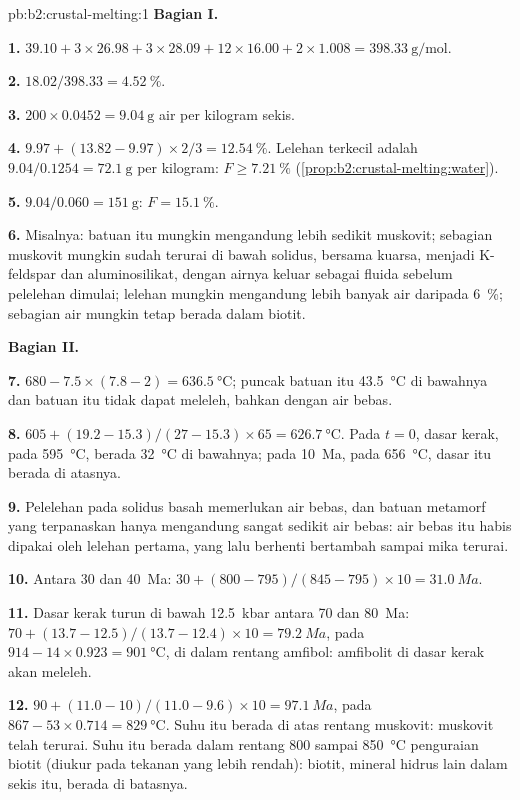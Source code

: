 \begin{solution}{pb:b2:crustal-melting:1}
\noindent\textbf{Bagian I.}

\textbf{1.} $39.10 + 3\times26.98 + 3\times28.09 + 12\times16.00 + 2\times1.008 =
\qty{398.33}{\gram\per\mole}$.

\textbf{2.} $18.02/398.33 = \qty{4.52}{\percent}$.

\textbf{3.} $200\times0.0452 = \qty{9.04}{\gram}$ air per kilogram sekis.

\textbf{4.} $9.97 + (13.82 - 9.97)\times2/3 = \qty{12.54}{\percent}$. Lelehan terkecil adalah
$9.04/0.1254 = \qty{72.1}{\gram}$ per kilogram: $F \ge \qty{7.21}{\percent}$
(\cref{prop:b2:crustal-melting:water}).

\textbf{5.} $9.04/0.060 = \qty{151}{\gram}$: $F = \qty{15.1}{\percent}$.

\textbf{6.} Misalnya: batuan itu mungkin mengandung lebih sedikit muskovit; sebagian muskovit mungkin
sudah terurai di bawah solidus, bersama kuarsa, menjadi K-feldspar dan
aluminosilikat, dengan airnya keluar sebagai fluida sebelum pelelehan dimulai; lelehan mungkin mengandung lebih banyak
air daripada \qty{6}{\percent}; sebagian air mungkin tetap berada dalam biotit.

\noindent\textbf{Bagian II.}

\textbf{7.} $680 - 7.5\times(7.8 - 2) = \qty{636.5}{\celsius}$; puncak batuan itu
\qty{43.5}{\celsius} di bawahnya dan batuan itu tidak dapat meleleh, bahkan dengan air bebas.

\textbf{8.} $605 + (19.2 - 15.3)/(27 - 15.3)\times65 = \qty{626.7}{\celsius}$. Pada
$t = 0$, dasar kerak, pada \qty{595}{\celsius}, berada \qty{32}{\celsius} di bawahnya; pada
\qty{10}{Ma}, pada \qty{656}{\celsius}, dasar itu berada di atasnya.

\textbf{9.} Pelelehan pada solidus basah memerlukan air bebas, dan batuan metamorf yang terpanaskan
hanya mengandung sangat sedikit air bebas: air bebas itu habis dipakai oleh lelehan pertama, yang lalu berhenti bertambah
sampai mika terurai.

\textbf{10.} Antara 30 dan \qty{40}{Ma}: $30 + (800 - 795)/(845 - 795)\times10 =
\qty{31.0}{Ma}$.

\textbf{11.} Dasar kerak turun di bawah \qty{12.5}{kbar} antara 70 dan \qty{80}{Ma}:
$70 + (13.7 - 12.5)/(13.7 - 12.4)\times10 = \qty{79.2}{Ma}$, pada
$914 - 14\times0.923 = \qty{901}{\celsius}$, di dalam rentang amfibol: amfibolit
di dasar kerak akan meleleh.

\textbf{12.} $90 + (11.0 - 10)/(11.0 - 9.6)\times10 = \qty{97.1}{Ma}$, pada $867 -
53\times0.714 = \qty{829}{\celsius}$. Suhu itu berada di atas rentang muskovit: muskovit
telah terurai. Suhu itu berada dalam rentang 800 sampai \qty{850}{\celsius} penguraian biotit
(diukur pada tekanan yang lebih rendah): biotit, mineral hidrus lain dalam sekis itu, berada di
batasnya.


\end{solution}
